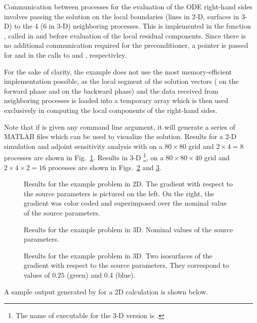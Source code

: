 Communication between processes for the evaluation of the ODE right-hand sides involves
passing the solution on the local boundaries (lines in 2-D, surfaces in 3-D) to 
the 4 (6 in 3-D) neighboring processes. This is implemented in the function 
, called in  and  before evaluation of the local residual 
components. Since there is no additional communication required for the {\cvbbdpre}
preconditioner, a  pointer is passed for  and  in the
calls to  and , respectivley.

For the sake of clarity, the  example does not use the most 
memory-efficient implementation possible, as the local segment of the 
solution vectors ( on the forward phase and  on the backward phase)
and the data received from neighboring processes is loaded into a temporary 
array  which is then used exclusively in computing the local components
of the right-hand sides.

Note that if  is given any command line argument, it will generate
a series of MATLAB files which can be used to visualize the solution.
Results for a 2-D simulation and adjoint sensitivity analysis with 
on a $80 \times 80$ grid and $2 \times 4 = 8$ processes are shown in Fig.~\ref{f:cvsadjkryx_p2D}.
Results in 3-D \footnote{The name of executable for the 3-D version is .}, 
on a $80 \times 80 \times 40$ grid and $2 \times 4 \times 2= 16$ processes
are shown in Figs.~\ref{f:cvsadjkryx_p3D_a} and \ref{f:cvsadjkryx_p3D_b}.
\begin{figure}
  {\centerline{}}
  \caption{Results for the  example problem in 2D. 
    The gradient with respect to the source parameters is pictured on the left. 
    On the right, the gradient was color coded and superimposed over the nominal value 
    of the source parameters.}
  \label{f:cvsadjkryx_p2D}
\end{figure}
\begin{figure}
  {\centerline{}}
  \caption{Results for the  example problem in 3D.
  Nominal values of the source parameters.}\label{f:cvsadjkryx_p3D_a}
\end{figure}
\begin{figure}
  {\centerline{}}
  \caption{Results for the  example problem in 3D.
  Two isosurfaces of the gradient with respect to the source parameters.
  They correspond to values of $0.25$ (green) and $0.4$ (blue).}\label{f:cvsadjkryx_p3D_b}  
\end{figure}
A sample output generated by  for a 2D calculation is shown below.


